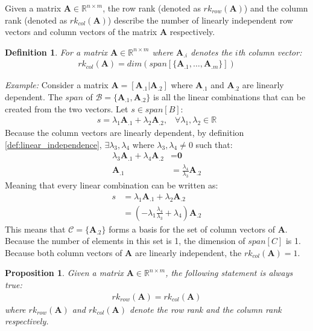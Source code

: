 \documentclass[a4paper,12pt]{book}
\newcommand{\set}[1]{\mathcal{#1}}
\newcommand{\matrx}[1]{\bm{#1}}
\newcommand{\vectr}[1]{\textbf{#1}}
\newcommand{\real}{\mathbb{R}}
\newcommand{\italic}[1]{\textit{#1}}
\newcommand{\rrank}[1]{rk_{row}(\matrx{#1})}
\newcommand{\crank}[1]{rk_{col}(\matrx{#1})}
\newtheorem{definition}{Definition}[section]
\newtheorem{proposition}{Proposition}[section]
\begin{document}
	Given a matrix $ \matrx{A} \in \real^{n \times m} $, the row rank (denoted as $ \rrank{A} $) and the column rank (denoted as $ \crank{A} $) describe the number of linearly independent row vectors and column vectors of the matrix $ \matrx{A} $ respectively.
	\begin{definition}
		\normalfont For a matrix $ \matrx{A} \in \real^{n \times m} $ where $ \matrx{A}_{.i} $ denotes the $ i $th column vector:
		\begin{align}
			\crank{A} = dim(span[\{\matrx{A}_{.1}, \ldots, \matrx{A}_{.m}\}])
		\end{align}
		\label{prop:c_rank_dim}
	\end{definition}
	\noindent\italic{Example:}
	Consider a matrix $\matrx{A} = [\matrx{A}_{.1} | \matrx{A}_{.2}]$ where $ \matrx{A}_{.1} $ and $ \matrx{A}_{.2} $ are linearly dependent. The $ span $ of $\set{B} = \{\matrx{A}_{.1}, \matrx{A}_{.2}\} $ is all the linear combinations that can be created from the two vectors. Let $ s \in span[B] $:  
	\begin{align}
		s = \lambda_1 \matrx{A}_{.1} + \lambda_2 \matrx{A}_{.2}, \hspace{10pt}\forall \lambda_1, \lambda_2 \in \real
	\end{align}
	Because the column vectors are linearly dependent, by definition \ref{def:linear_independence}, $ \exists \lambda_3, \lambda_4$ where $ \lambda_3,\lambda_4 \ne 0 $ such that: 
	\begin{align}
		\lambda_3 \matrx{A}_{.1} + \lambda_4 \matrx{A}_{.2} &= \vectr{0} \\
		\matrx{A}_{.1} &= \frac{\lambda_4}{\lambda_3} \matrx{A}_{.2}
	\end{align}
	Meaning that every linear combination can be written as:
	\begin{align}
		s &= \lambda_1 \matrx{A}_{.1} + \lambda_2 \matrx{A}_{.2} \\
		&= (-\lambda_1 \frac{\lambda_4}{\lambda_3} + \lambda_4) \matrx{A}_{.2}
	\end{align}
	This means that $ \set{C} = \{\matrx{A}_{.2}\} $ forms a basis for the set of column vectors of $ \matrx{A} $. Because the number of elements in this set is 1, the dimension of $ span[C] $ is 1. Because both column vectors of $ \matrx{A} $ are linearly independent, the $ \crank{A} = 1$.
	\begin{proposition}
		\normalfont Given a matrix $ \matrx{A} \in \real^{n \times m}$, the following statement is always true:
		\begin{align}
			\rrank{A} = \crank{A}
			\label{eq:row_rank_col_rank}
		\end{align}
		where $ \rrank{A} $ and $ \crank{A} $ denote the row rank and the column rank respectively.
		\label{prop:row_rank_col_rank}
	\end{proposition}
\end{document}
